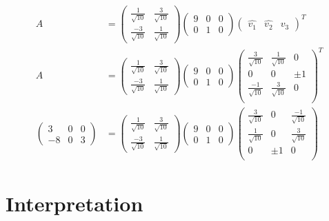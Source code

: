 \documentclass[11pt, a4paper]{article}
\begin{document}
\begin{align*}    
	A &= \begin{pmatrix}
	\frac{1}{\sqrt{10}} & \frac{3}{\sqrt{10}} \\
	\frac{-3}{\sqrt{10}} & \frac{1}{\sqrt{10}}
	\end{pmatrix}      \begin{pmatrix}
	9                    & 0                   & 0                    \\
	0                    & 1                   & 0                    
	\end{pmatrix} \begin{pmatrix}
	\hat{v_1}            & \hat{v_2}           & \hat{v_3}            
	\end{pmatrix}^T \\
	A &= \begin{pmatrix}
	\frac{1}{\sqrt{10}} & \frac{3}{\sqrt{10}} \\
	\frac{-3}{\sqrt{10}} & \frac{1}{\sqrt{10}}
	\end{pmatrix}      \begin{pmatrix}
	9                    & 0                   & 0                    \\
	0                    & 1                   & 0                    
	\end{pmatrix} \begin{pmatrix}
	\frac{3}{\sqrt{10}}  & \frac{1}{\sqrt{10}} & 0                    \\
	0                    & 0                   & \pm 1                \\
	\frac{-1}{\sqrt{10}} & \frac{3}{\sqrt{10}} & 0                    \\              
	\end{pmatrix}^T \\
	\begin{pmatrix}
	3                    & 0                   & 0                    \\
	-8                   & 0                   & 3                    
	\end{pmatrix} &= \begin{pmatrix}
	\frac{1}{\sqrt{10}} & \frac{3}{\sqrt{10}} \\
	\frac{-3}{\sqrt{10}} & \frac{1}{\sqrt{10}}
	\end{pmatrix}      \begin{pmatrix}
	9                    & 0                   & 0                    \\
	0                    & 1                   & 0                    
	\end{pmatrix} \begin{pmatrix}
	\frac{3}{\sqrt{10}}  & 0                   & \frac{-1}{\sqrt{10}} \\
	\frac{1}{\sqrt{10}}  & 0                   & \frac{3}{\sqrt{10}}  \\              
	0                    & \pm 1               & 0                    \\    
	\end{pmatrix}
\end{align*}

\section{Interpretation}
\end{document}
